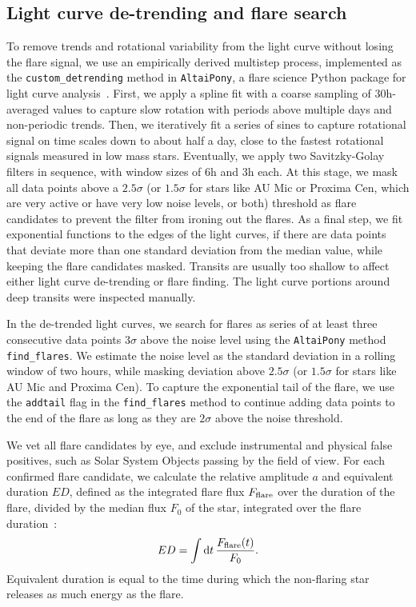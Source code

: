 \documentclass[twocolumn]{aastex631}
\begin{document}
\subsection{Light curve de-trending and flare search}
\label{sec:methods:flaresearch}
To remove trends and rotational variability from the light curve without losing the flare signal, we use an empirically derived multistep process, implemented as the \texttt{custom\_detrending} method in \texttt{AltaiPony}, a flare science Python package for light curve analysis~\citep{ilin2021altaipony}. First, we apply a spline fit with a coarse sampling of 30h-averaged values to capture slow rotation with periods above multiple days and non-periodic trends. Then, we iteratively fit a series of sines to capture rotational signal on time scales down to about half a day, close to the fastest rotational signals measured in low mass stars. Eventually, we apply two Savitzky-Golay~\citep{savitzky1964smoothing} filters in sequence, with window sizes of 6h and 3h each. At this stage, we mask all data points above a $2.5 \sigma$ (or $1.5 \sigma$ for stars like AU Mic or Proxima Cen, which are very active or have very low noise levels, or both) threshold as flare candidates to prevent the filter from ironing out the flares. As a final step, we fit exponential functions to the edges of the light curves, if there are data points that deviate more than one standard deviation from the median value, while keeping the flare candidates masked. Transits are usually too shallow to affect either light curve de-trending or flare finding. The light curve portions around deep transits were inspected manually.

In the de-trended light curves, we search for flares as series of at least three consecutive data points $3\sigma$ above the noise level using the \texttt{AltaiPony} method \texttt{find\_flares}. We estimate the noise level as the standard deviation in a rolling window of two hours, while masking deviation above $2.5\sigma$ (or $1.5\sigma$  for stars like AU Mic and Proxima Cen). To capture the exponential tail of the flare, we use the \texttt{addtail} flag in the \texttt{find\_flares} method to continue adding data points to the end of the flare as long as they are $2\sigma$ above the noise threshold.

We vet all flare candidates by eye, and exclude instrumental and physical false positives, such as Solar System Objects passing by the field of view. For each confirmed flare candidate, we calculate the relative amplitude $a$ and equivalent duration $ED$, defined as the integrated flare flux $F_{\rm flare}$ over the duration of the flare, divided by the median flux $F_0$ of the star, integrated over the flare duration~\citep{gershberg1972results}:
\begin{equation}
\label{eq:ED}
ED=\displaystyle \int \mathrm dt\, \frac{F_{\rm flare}(t)}{F_0}.
\end{equation}
Equivalent duration is equal to the time during which the non-flaring star releases as much energy as the flare.
\end{document}

